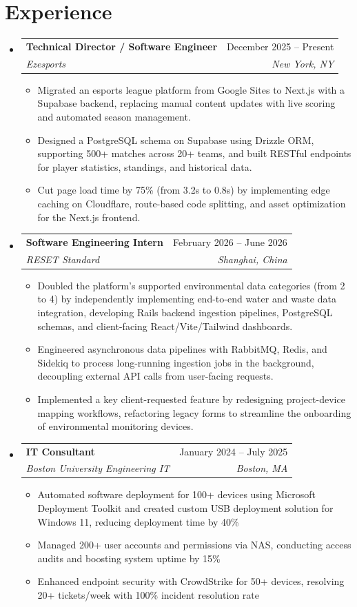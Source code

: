 \documentclass[letterpaper,11pt]{article}
\makeatletter
\newcommand{\resumeItem}[1]{
  \item\small{
    {#1 \vspace{-2pt}}
  }
}
\newcommand{\resumeSubheading}[4]{
  \vspace{-2pt}\item
    \begin{tabular*}{0.97\textwidth}[t]{l@{\extracolsep{\fill}}r}
      \textbf{#1} & #2 \\
      \textit{\small#3} & \textit{\small #4} \\
    \end{tabular*}\vspace{-7pt}
}
\newcommand{\resumeSubHeadingListStart}{\begin{itemize}[leftmargin=0.15in, label={}]}
\newcommand{\resumeSubHeadingListEnd}{\end{itemize}\vspace{-8pt}}
\newcommand{\resumeItemListStart}{\begin{itemize}}
\newcommand{\resumeItemListEnd}{\end{itemize}\vspace{-5pt}}
\makeatother
\begin{document}
\section{Experience}
  \resumeSubHeadingListStart
    \resumeSubheading
      {Technical Director / Software Engineer}{December 2025 -- Present}
      {Ezesports}{New York, NY}
      \resumeItemListStart
        \resumeItem{Migrated an esports league platform from Google Sites to Next.js with a Supabase backend, replacing manual content updates with live scoring and automated season management.}
        \resumeItem{Designed a PostgreSQL schema on Supabase using Drizzle ORM, supporting 500+ matches across 20+ teams, and built RESTful endpoints for player statistics, standings, and historical data.}
        \resumeItem{Cut page load time by 75\% (from 3.2s to 0.8s) by implementing edge caching on Cloudflare, route-based code splitting, and asset optimization for the Next.js frontend.}
      \resumeItemListEnd
    \resumeSubheading
      {Software Engineering Intern}{February 2026 -- June 2026}
      {RESET Standard}{Shanghai, China}
      \resumeItemListStart
        \resumeItem{Doubled the platform's supported environmental data categories (from 2 to 4) by independently implementing end-to-end water and waste data integration, developing Rails backend ingestion pipelines, PostgreSQL schemas, and client-facing React/Vite/Tailwind dashboards.}
        \resumeItem{Engineered asynchronous data pipelines with RabbitMQ, Redis, and Sidekiq to process long-running ingestion jobs in the background, decoupling external API calls from user-facing requests.}
        \resumeItem{Implemented a key client-requested feature by redesigning project-device mapping workflows, refactoring legacy forms to streamline the onboarding of environmental monitoring devices.}
      \resumeItemListEnd
    \resumeSubheading
      {IT Consultant}{January 2024 -- July 2025}
      {Boston University Engineering IT}{Boston, MA}
      \resumeItemListStart
        \resumeItem{Automated software deployment for 100+ devices using Microsoft Deployment Toolkit and created custom USB deployment solution for Windows 11, reducing deployment time by 40\%}
        \resumeItem{Managed 200+ user accounts and permissions via NAS, conducting access audits and boosting system uptime by 15\%}
        \resumeItem{Enhanced endpoint security with CrowdStrike for 50+ devices, resolving 20+ tickets/week with 100\% incident resolution rate}
      \resumeItemListEnd
  \resumeSubHeadingListEnd

\end{document}
